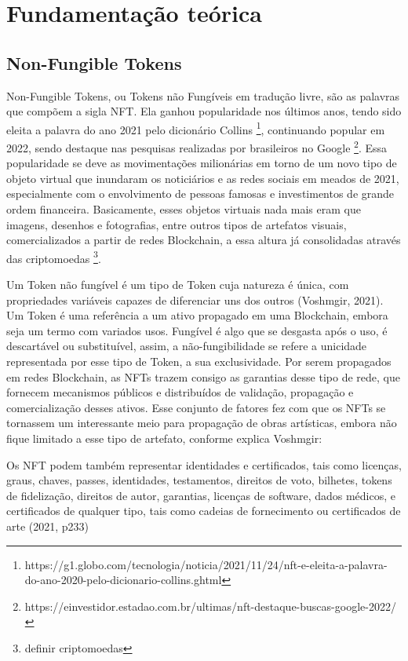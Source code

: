 \chapter{Fundamentação teórica}
\label{cap:fundamentacao-teorica}

\section{Non-Fungible Tokens}
\label{cap:non-fungible tokens}

Non-Fungible Tokens, ou Tokens não Fungíveis em tradução livre, são as palavras que compõem a sigla NFT. Ela ganhou popularidade nos últimos anos, tendo sido eleita a palavra do ano 2021 pelo dicionário Collins \footnote{https://g1.globo.com/tecnologia/noticia/2021/11/24/nft-e-eleita-a-palavra-do-ano-2020-pelo-dicionario-collins.ghtml}, continuando popular em 2022, sendo destaque nas pesquisas realizadas por brasileiros no Google \footnote{https://einvestidor.estadao.com.br/ultimas/nft-destaque-buscas-google-2022/}. Essa popularidade se deve as movimentações milionárias em torno de um novo tipo de objeto virtual que inundaram os noticiários e as redes sociais em meados de 2021, especialmente com o envolvimento de pessoas famosas e investimentos de grande ordem financeira. Basicamente, esses objetos virtuais nada mais eram que imagens, desenhos e fotografias, entre outros tipos de artefatos visuais, comercializados a partir de redes Blockchain, a essa altura já consolidadas através das criptomoedas \footnote{definir criptomoedas}.

Um Token não fungível é um tipo de Token cuja natureza é única, com propriedades variáveis capazes de diferenciar uns dos outros (Voshmgir, 2021). Um Token é uma referência a um ativo propagado em uma Blockchain, embora seja um termo com variados usos. Fungível é algo que se desgasta após o uso, é descartável ou substituível, assim, a não-fungibilidade se refere a unicidade representada por esse tipo de Token, a sua exclusividade. Por serem propagados em redes Blockchain, as NFTs trazem consigo as garantias desse tipo de rede, que fornecem mecanismos públicos e distribuídos de validação, propagação e comercialização desses ativos. Esse conjunto de fatores fez com que os NFTs se tornassem um interessante meio para propagação de obras artísticas, embora não fique limitado a esse tipo de artefato, conforme explica Voshmgir:

\begin{citacao}
	 Os NFT podem também representar identidades e certificados, tais como licenças, graus, chaves, passes, identidades, testamentos, direitos de voto, bilhetes, tokens de fidelização, direitos de autor, garantias, licenças de software, dados médicos, e certificados de qualquer tipo, tais como cadeias de fornecimento ou certificados de arte (2021, p233)	
\end{citacao}

